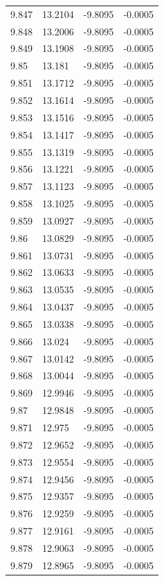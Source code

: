 \begin{tabular}{llll}
9.847 & 13.2104 & -9.8095 & -0.0005 \\
9.848 & 13.2006 & -9.8095 & -0.0005 \\
9.849 & 13.1908 & -9.8095 & -0.0005 \\
9.85 & 13.181 & -9.8095 & -0.0005 \\
9.851 & 13.1712 & -9.8095 & -0.0005 \\
9.852 & 13.1614 & -9.8095 & -0.0005 \\
9.853 & 13.1516 & -9.8095 & -0.0005 \\
9.854 & 13.1417 & -9.8095 & -0.0005 \\
9.855 & 13.1319 & -9.8095 & -0.0005 \\
9.856 & 13.1221 & -9.8095 & -0.0005 \\
9.857 & 13.1123 & -9.8095 & -0.0005 \\
9.858 & 13.1025 & -9.8095 & -0.0005 \\
9.859 & 13.0927 & -9.8095 & -0.0005 \\
9.86 & 13.0829 & -9.8095 & -0.0005 \\
9.861 & 13.0731 & -9.8095 & -0.0005 \\
9.862 & 13.0633 & -9.8095 & -0.0005 \\
9.863 & 13.0535 & -9.8095 & -0.0005 \\
9.864 & 13.0437 & -9.8095 & -0.0005 \\
9.865 & 13.0338 & -9.8095 & -0.0005 \\
9.866 & 13.024 & -9.8095 & -0.0005 \\
9.867 & 13.0142 & -9.8095 & -0.0005 \\
9.868 & 13.0044 & -9.8095 & -0.0005 \\
9.869 & 12.9946 & -9.8095 & -0.0005 \\
9.87 & 12.9848 & -9.8095 & -0.0005 \\
9.871 & 12.975 & -9.8095 & -0.0005 \\
9.872 & 12.9652 & -9.8095 & -0.0005 \\
9.873 & 12.9554 & -9.8095 & -0.0005 \\
9.874 & 12.9456 & -9.8095 & -0.0005 \\
9.875 & 12.9357 & -9.8095 & -0.0005 \\
9.876 & 12.9259 & -9.8095 & -0.0005 \\
9.877 & 12.9161 & -9.8095 & -0.0005 \\
9.878 & 12.9063 & -9.8095 & -0.0005 \\
9.879 & 12.8965 & -9.8095 & -0.0005 \\

\end{tabular}
